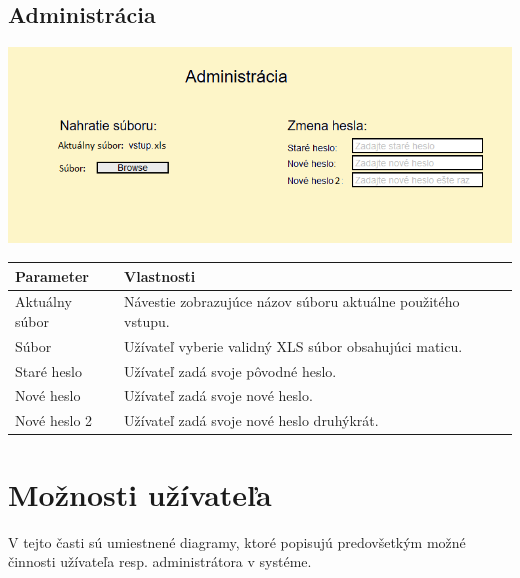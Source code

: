 \documentclass[12pt,a4paper]{report}
\begin{document}
\subsection[Administrácia]{\rmfamily\bfseries
	Administrácia}

\includegraphics[scale=0.7]{admin}

\begin{table}[h!]
	\centering
	\begin{tabular}{|>{\centering\arraybackslash}m{3in}|>{\centering\arraybackslash}m{3in}|}
		\hline
		\centering Parameter & Vlastnosti \\ [0ex]
		\hline
		Aktuálny súbor & Návestie zobrazujúce názov súboru aktuálne použitého vstupu.\\ [0ex]
		\hline
		Súbor & Užívateľ  vyberie  validný XLS súbor obsahujúci maticu. \\ [0ex]
		\hline
		Staré heslo & Užívateľ zadá svoje pôvodné heslo.\\ [0ex]	
		\hline
		Nové heslo & Užívateľ zadá svoje nové heslo. \\ [0ex]		
		\hline
		Nové heslo 2 & Užívateľ zadá svoje nové heslo druhýkrát. \\ [0ex]		
		\hline
	\end{tabular}
\end{table}
\pagebreak
\section[Možnosti užívateľa]{\rmfamily\bfseries
	Možnosti užívateľa}

	V tejto časti sú umiestnené diagramy, ktoré popisujú predovšetkým možné činnosti užívateľa resp. administrátora v systéme.
\end{document}
